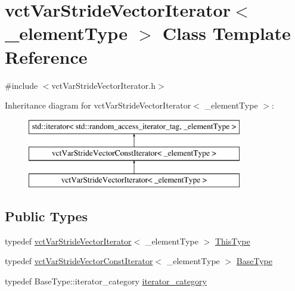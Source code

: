 \hypertarget{classvct_var_stride_vector_iterator}{}\section{vct\+Var\+Stride\+Vector\+Iterator$<$ \+\_\+element\+Type $>$ Class Template Reference}
\label{classvct_var_stride_vector_iterator}


{\ttfamily \#include $<$vct\+Var\+Stride\+Vector\+Iterator.\+h$>$}

Inheritance diagram for vct\+Var\+Stride\+Vector\+Iterator$<$ \+\_\+element\+Type $>$\+:\begin{figure}[H]
\begin{center}
\leavevmode
\includegraphics[height=3.000000cm]{d0/d39/classvct_var_stride_vector_iterator}
\end{center}
\end{figure}
\subsection*{Public Types}
\begin{DoxyCompactItemize}
\item 
typedef \hyperlink{classvct_var_stride_vector_iterator}{vct\+Var\+Stride\+Vector\+Iterator}$<$ \+\_\+element\+Type $>$ \hyperlink{classvct_var_stride_vector_iterator_a9c3effbe4fa874856b5b295a5fec25be}{This\+Type}
\item 
typedef \hyperlink{classvct_var_stride_vector_const_iterator}{vct\+Var\+Stride\+Vector\+Const\+Iterator}$<$ \+\_\+element\+Type $>$ \hyperlink{classvct_var_stride_vector_iterator_a4d9d314c1190fa1e730dce082ac1010f}{Base\+Type}
\item 
typedef Base\+Type\+::iterator\+\_\+category \hyperlink{classvct_var_stride_vector_iterator_a17ad751139c29df7d21eb9c05e2f391b}{iterator\+\_\+category}
\end{DoxyCompactItemize}
